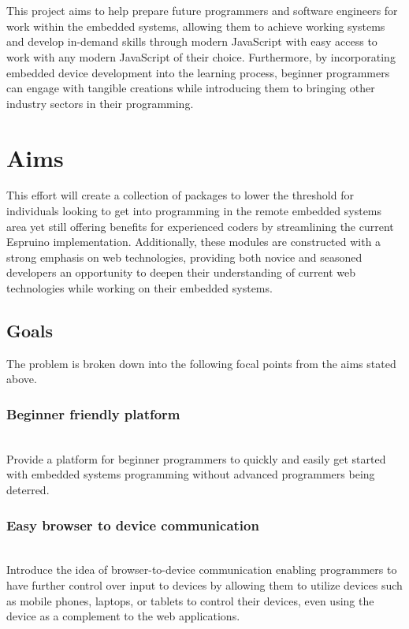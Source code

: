 \documentclass{l4proj}
\begin{document}
\\ \\
This project aims to help prepare future programmers and software engineers for work within the embedded systems, allowing them to achieve working systems and develop in-demand skills through modern JavaScript with easy access to work with any modern JavaScript of their choice. Furthermore, by incorporating embedded device development into the learning process, beginner programmers can engage with tangible creations while introducing them to bringing other industry sectors in their programming.

\section{Aims}

\text This effort will create a collection of packages to lower the threshold for individuals looking to get into programming in the remote embedded systems area yet still offering benefits for experienced coders by streamlining the current Espruino implementation. Additionally, these modules are constructed with a strong emphasis on web technologies, providing both novice and seasoned developers an opportunity to deepen their understanding of current web technologies while working on their embedded systems.
\subsection{Goals}
\text The problem is broken down into the following focal points from the aims stated above.
\\
\subsubsection{Beginner friendly platform} \hfill\\
\text Provide a platform for beginner programmers to quickly and easily get started with embedded systems programming without advanced programmers being deterred.
\\
\subsubsection{Easy browser to device communication} \hfill\\
\text Introduce the idea of browser-to-device communication enabling programmers to have further control over input to devices by allowing them to utilize devices such as mobile phones, laptops, or tablets to control their devices, even using the device as a complement to the web applications.
\\
\end{document}
